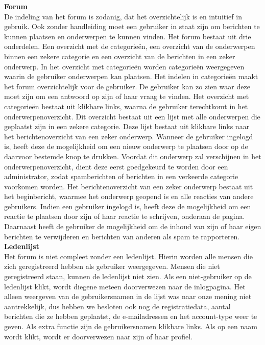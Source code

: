 \documentclass[a4paper,12pt]{article}
\begin{document}
{\bfseries Forum}\\
De indeling van het forum is zodanig, dat het overzichtelijk is en intuitief in gebruik. Ook zonder handleiding moet een gebruiker in staat zijn om berichten te kunnen plaatsen en onderwerpen te kunnen vinden.
Het forum bestaat uit drie onderdelen. Een overzicht met de categorie\"en, een overzicht van de onderwerpen binnen een zekere categorie en een overzicht van de berichten in een zeker onderwerp. In het overzicht met categorie\"en worden categorie\"en weergegeven waarin de gebruiker onderwerpen kan plaatsen. Het indelen in categorie\"en maakt het forum overzichtelijk voor de gebruiker. De gebruiker kan zo zien waar deze moet zijn om een antwoord op zijn of haar vraag te vinden. Het overzicht met categorie\"en bestaat uit klikbare links, waarna de gebruiker terechtkomt in het onderwerpenoverzicht. Dit overzicht bestaat uit een lijst met alle onderwerpen die geplaatst zijn in een zekere categorie. Deze lijst bestaat uit klikbare links naar het berichtenoverzicht van een zeker onderwerp. Wanneer de gebruiker ingelogd is, heeft deze de mogelijkheid om een nieuw onderwerp te plaatsen door op de daarvoor bestemde knop te drukken. Voordat dit onderwerp zal verschijnen in het onderwerpenoverzicht, dient deze eerst goedgekeurd te worden door een administrator, zodat spamberichten of berichten in een verkeerde categorie voorkomen worden. Het berichtenoverzicht van een zeker onderwerp bestaat uit het beginbericht, waarmee het onderwerp geopend is en alle reacties van andere gebruikers. Indien een gebruiker ingelogd is, heeft deze de mogelijkheid om een reactie te plaatsen door zijn of haar reactie te schrijven, onderaan de pagina. Daarnaast heeft de gebruiker de mogelijkheid om de inhoud van zijn of haar eigen berichten te verwijderen en berichten van anderen als spam te rapporteren.\\


{\bfseries Ledenlijst}\\
Het forum is niet compleet zonder een ledenlijst. Hierin worden alle mensen die zich geregistreerd hebben als gebruiker weergegeven. Mensen die niet geregistreerd staan, kunnen de ledenlijst niet zien. Als een niet-gebruiker op de ledenlijst klikt, wordt diegene meteen doorverwezen naar de inlogpagina. Het alleen weergeven van de gebruikersnamen in de lijst was naar onze mening niet aantrekkelijk, dus hebben we besloten ook nog de registratiedata, aantal berichten die ze hebben geplaatst, de e-mailadressen en het account-type weer te geven. Als extra functie zijn de gebruikersnamen klikbare links. Als op een naam wordt klikt, wordt er doorverwezen naar zijn of haar profiel. \\
\end{document}
